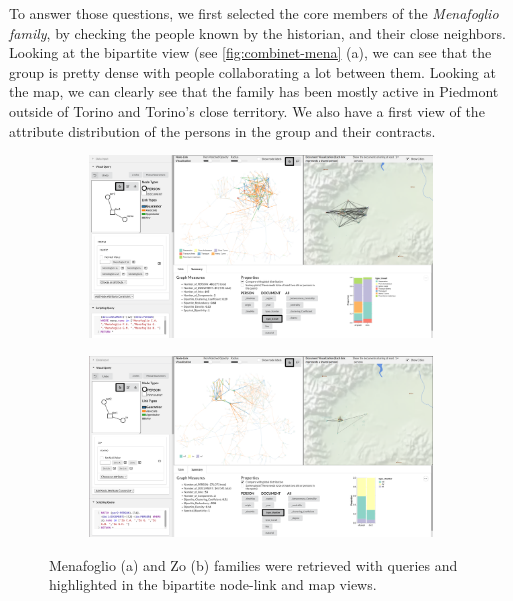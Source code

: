 To answer those questions, we first selected the core members of the \textit{Menafoglio family}, by checking the people known by the historian, and their close neighbors.
Looking at the bipartite view (see \autoref{fig:combinet-mena} (a), we can see that the group is pretty dense with people collaborating a lot between them.
Looking at the map, we can clearly see that the family has been mostly active in Piedmont outside of Torino and Torino's close territory.
We also have a first view of the attribute distribution of the persons in the group and their contracts.
\begin{figure}[!ht]
    \centering

     \begin{subfigure}[b]{1\linewidth}
    \includegraphics[width=1\linewidth, trim={35cm 37cm 10cm 0}, clip]{static/figures/ComBiNet/OriginalPaperFigures/suppMaterial/menaFamilyResults}
         \caption{}
    \end{subfigure}
    \begin{subfigure}[b]{1\linewidth}
        \includegraphics[width=1\linewidth, trim={35cm 37cm 10cm 0}, clip]{static/figures/ComBiNet/OriginalPaperFigures/suppMaterial/ZoFamilyResults}
        \caption{}
    \end{subfigure}

    \caption{Menafoglio (a) and Zo (b) families were retrieved with queries and highlighted in the bipartite node-link and map views.}
    \label{fig:combinet-mena}
\end{figure}
